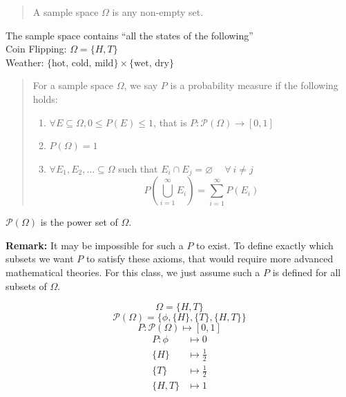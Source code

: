 

\begin{quote}
    A sample space $\Omega$ is any non-empty set.
\end{quote}

\begin{example}[][2.1]
    The sample space contains ``all the states of the following''
    \\Coin Flipping: $\Omega = \{H, T\}$
    \\Weather: $\{\text{hot, cold, mild}\} \times \{\text{wet, dry}\}$
\end{example}

\begin{quote}
    For a sample space $\Omega$, we say $P$ is a probability measure if the following holds:
    \begin{enumerate}[label=\roman*)]
        \item $\forall E \subseteq \Omega, 0 \leq P(E) \leq 1$, that is $P:\mathcal{P}(\Omega) \to [0,1]$
        \item $P(\Omega) = 1$
        \item $\forall E_1, E_2, \dots \subseteq \Omega$ such that $E_i \cap E_j = \varnothing \ \quad\forall\ i \neq j$
        \[P\left(\bigcup_{i=1}^{\infty} E_i\right) = \sum_{i=1}^{\infty}P(E_i)\]
    \end{enumerate}
\end{quote}

$\mathcal{P}(\Omega)$ is the power set of $\Omega$.

\textbf{Remark:} It may be impossible for such a $P$ to exist. To define exactly which subsets we want $P$ to satisfy these axioms, that would require more advanced mathematical theories. For this class, we just assume such a $P$ is defined for all subsets of $\Omega$.

\begin{example}
    \[\Omega = \{H, T\}\]
    \[\mathcal{P}(\Omega) = \{\phi, \{H\}, \{T\}, \{H, T\}\}\]
    \[P: \mathcal{P}(\Omega) \mapsto [0, 1]\]
    \begin{align*}
        P: \phi &\mapsto 0 \\
        \{H\} &\mapsto \frac{1}{2} \\
        \{T\} &\mapsto \frac{1}{2} \\
        \{H, T\} &\mapsto 1
    \end{align*}
\end{example}

